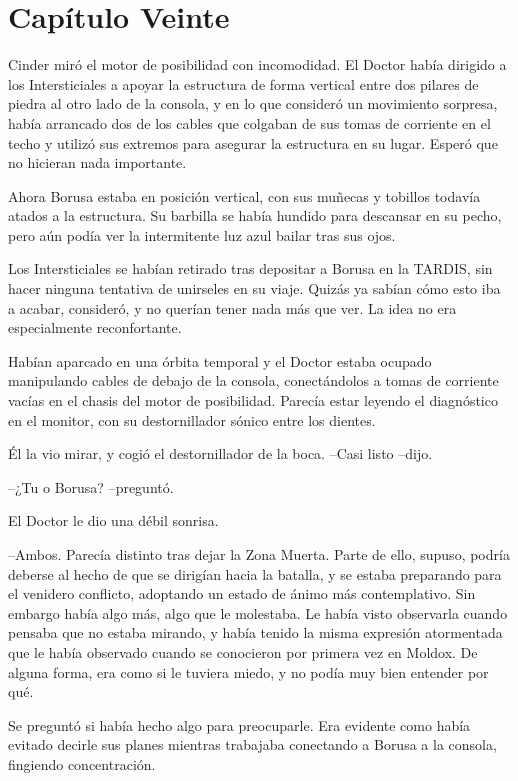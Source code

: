 \chapter*{Capítulo Veinte}


Cinder miró el motor de posibilidad con incomodidad. El Doctor había dirigido a los Intersticiales a apoyar la estructura de forma vertical entre dos pilares de piedra al otro lado de la consola, y en lo que consideró un movimiento sorpresa, había arrancado dos de los cables que colgaban de sus tomas de corriente en el techo y utilizó sus extremos para asegurar la estructura en su lugar. Esperó que no hicieran nada importante.

Ahora Borusa estaba en posición vertical, con sus muñecas y tobillos todavía atados a la estructura. Su barbilla se había hundido para descansar en su pecho, pero aún podía ver la intermitente luz azul bailar tras sus ojos.

Los Intersticiales se habían retirado tras depositar a Borusa en la TARDIS, sin hacer ninguna tentativa de unirseles en su viaje. Quizás ya sabían cómo esto iba a acabar, consideró, y no querían tener nada más que ver. La idea no era especialmente reconfortante.

Habían aparcado en una órbita temporal y el Doctor estaba ocupado manipulando cables de debajo de la consola, conectándolos a tomas de corriente vacías en el chasis del motor de posibilidad. Parecía estar leyendo el diagnóstico en el monitor, con su destornillador sónico entre los dientes.

Él la vio mirar, y cogió el destornillador de la boca. 
--Casi listo --dijo.

--¿Tu o Borusa? --preguntó.

El Doctor le dio una débil sonrisa. 

--Ambos.
Parecía distinto tras dejar la Zona Muerta. Parte de ello, supuso, podría deberse al hecho de que se dirigían hacia la batalla, y se estaba preparando para el venidero conflicto, adoptando un estado de ánimo más contemplativo. Sin embargo había algo más, algo que le molestaba. Le había visto observarla cuando pensaba que no estaba mirando, y había tenido la misma expresión atormentada que le había observado cuando se conocieron por primera vez en Moldox. De alguna forma, era como si le tuviera miedo, y no podía muy bien entender por qué.

Se preguntó si había hecho algo para preocuparle. Era evidente como había evitado decirle sus planes mientras trabajaba conectando a Borusa a la consola, fingiendo concentración.

